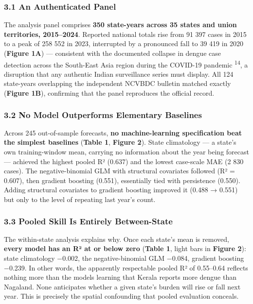 \documentclass[
  10pt,
  twocolumn]{article}
\begin{document}
\subsubsection{3.1 An Authenticated Panel}\label{an-authenticated-panel}

The analysis panel comprises \textbf{350 state-years across 35 states
and union territories, 2015--2024}. Reported national totals rise from
91 397 cases in 2015 to a peak of 258 552 in 2023, interrupted by a
pronounced fall to 39 419 in 2020 (\textbf{Figure 1A}) --- consistent
with the documented collapse in dengue case detection across the
South-East Asia region during the COVID-19 pandemic
\textsuperscript{14}, a disruption that any authentic Indian
surveillance series must display. All 124 state-years overlapping the
independent NCVBDC bulletin matched exactly (\textbf{Figure 1B}),
confirming that the panel reproduces the official record.

\subsubsection{3.2 No Model Outperforms Elementary
Baselines}\label{no-model-outperforms-elementary-baselines}

Across 245 out-of-sample forecasts, \textbf{no machine-learning
specification beat the simplest baselines} (\textbf{Table 1},
\textbf{Figure 2}). State climatology --- a state's own training-window
mean, carrying no information about the year being forecast --- achieved
the highest pooled R² (0.637) and the lowest case-scale MAE (2 830
cases). The negative-binomial GLM with structural covariates followed
(R² = 0.607), then gradient boosting (0.551), essentially tied with
persistence (0.550). Adding structural covariates to gradient boosting
improved it (0.488 → 0.551) but only to the level of repeating last
year's count.

\subsubsection{3.3 Pooled Skill Is Entirely
Between-State}\label{pooled-skill-is-entirely-between-state}

The within-state analysis explains why. Once each state's mean is
removed, \textbf{every model has an R² at or below zero} (\textbf{Table
1}, light bars in \textbf{Figure 2}): state climatology −0.002, the
negative-binomial GLM −0.084, gradient boosting −0.239. In other words,
the apparently respectable pooled R² of 0.55--0.64 reflects nothing more
than the models learning that Kerala reports more dengue than Nagaland.
None anticipates whether a given state's burden will rise or fall next
year. This is precisely the spatial confounding that pooled evaluation
conceals.
\end{document}

